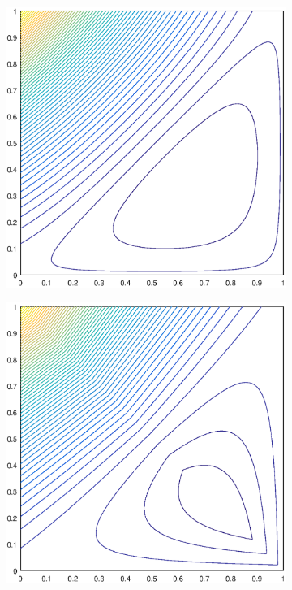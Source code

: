 \documentclass[11pt]{article}
\begin{document}
\begin{figure}
\centering
	\begin{subfigure}[b]{0.25\textwidth}
		\centering
		\includegraphics[width=\textwidth]{figures/square_WACHSPRESS2_contour_b4.eps}
		\caption{}
	\end{subfigure}
	\hspace{1cm}
	\begin{subfigure}[b]{0.25\textwidth}
		\centering
		\includegraphics[width=\textwidth]{figures/square_PWLD2_contour_b4.eps}

\end{subfigure}
\end{figure}
\end{document}
